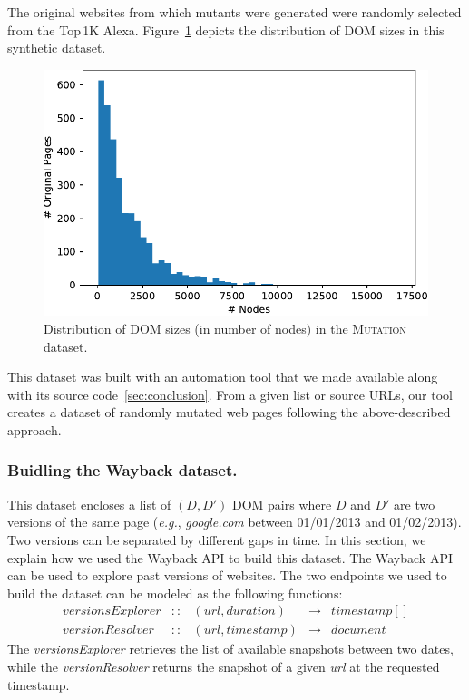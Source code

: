 \documentclass[preprint, 12pt]{elsarticle}
\begin{document}
The original websites from which mutants were generated were randomly selected from the Top\,1K Alexa.
Figure~\ref{fig:distribution} depicts the distribution of DOM sizes in this synthetic dataset. 

\begin{figure}[h]
  \centering
  \includegraphics[width=.8\linewidth]{distribution}
  \caption{Distribution of DOM sizes (in number of nodes) in the \textsc{Mutation} dataset.}
  \label{fig:distribution}
\end{figure}

This dataset was built with an automation tool that we made available along with its source code~\ref{sec:conclusion}.
From a given list or source URLs, our tool creates a dataset of randomly mutated web pages following the above-described approach.

\subsubsection{Buidling the {\sc Wayback} dataset.}\label{waybackDataset}
This dataset encloses a list of $(D, D')$ DOM pairs where $D$ and $D'$ are two versions of the same page (\emph{e.g.}, \textit{google.com} between 01/01/2013 and 01/02/2013).
Two versions can be separated by different gaps in time.
In this section, we explain how we used the Wayback API to build this dataset.
The Wayback API can be used to explore past versions of websites.
The two endpoints we used to build the dataset can be modeled as the following functions:
\begin{align*}
versionsExplorer &::& (url, duration)  & \to & timestamp[] \\
versionResolver  &::& (url, timestamp) & \to & document
\end{align*}
The \textit{versionsExplorer} retrieves the list of available snapshots between two dates, while the \textit{versionResolver} returns the snapshot of a given \textit{url} at the requested timestamp.
\end{document}
